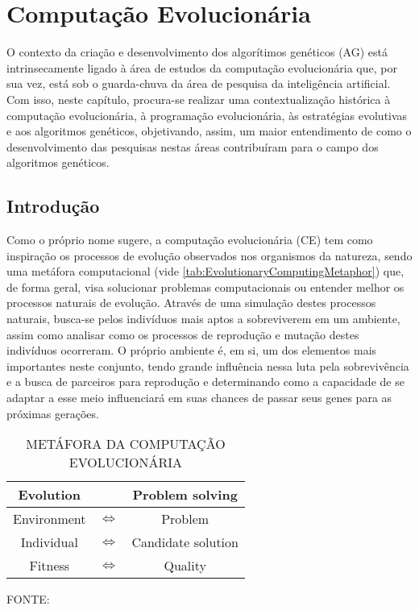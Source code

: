 \chapter{Computação Evolucionária}

O contexto da criação e desenvolvimento dos algorítimos genéticos (AG) está intrinsecamente ligado à área de estudos da computação evolucionária que, por sua vez, está sob o guarda-chuva da área de pesquisa da inteligência artificial. Com isso, neste capítulo, procura-se realizar uma contextualização histórica à computação evolucionária, à programação evolucionária, às estratégias evolutivas e aos algoritmos genéticos, objetivando, assim, um maior entendimento de como o desenvolvimento das pesquisas nestas áreas contribuíram para o campo dos algoritmos genéticos.

\section{Introdução}

Como o próprio nome sugere, a computação evolucionária (CE) tem como inspiração os processos de evolução observados nos organismos da natureza, sendo uma metáfora computacional (vide \autoref{tab:EvolutionaryComputingMetaphor}) que, de forma geral, visa solucionar problemas computacionais ou entender melhor os processos naturais de evolução. Através de uma simulação destes processos naturais, busca-se pelos indivíduos mais aptos a sobreviverem em um ambiente, assim como analisar como os processos de reprodução e mutação destes indivíduos ocorreram. O próprio ambiente é, em si, um dos elementos mais importantes neste conjunto, tendo grande influência nessa luta pela sobrevivência e a busca de parceiros para reprodução e determinando como a capacidade de se adaptar a esse meio influenciará em suas chances de passar seus genes para as próximas gerações.

\begin{table}[h!]
	\caption{\uppercase{Metáfora da Computação Evolucionária}}
	\small
	\centering
	\vspace{2pt}
	\def\arraystretch{1.2}
	\begin{tabular}{ |ccc| }
		\hline
		Evolution & ~ & Problem solving \\ \hline
		Environment & $\Longleftrightarrow$ & Problem \\
		Individual & $\Longleftrightarrow$ & Candidate solution \\
		Fitness & $\Longleftrightarrow$ & Quality \\ \hline
	\end{tabular}
	\label{tab:EvolutionaryComputingMetaphor}
	\begin{minipage}{1 \textwidth}
		\centering
		\vspace{6pt}
		FONTE:~\cite{eiben_introduction_2015}
	\end{minipage}
\end{table}

